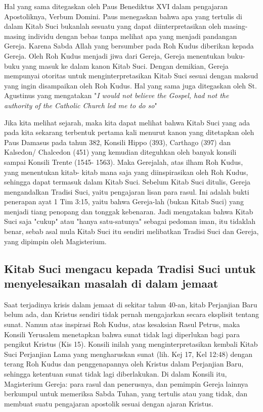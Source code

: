 Hal yang sama ditegaskan oleh Paus Benediktus XVI dalam pengajaran Apostoliknya, Verbum Domini. Paus menegaskan bahwa apa yang tertulis di dalam Kitab Suci bukanlah sesuatu yang dapat diinterpretasikan oleh masing-masing individu dengan bebas tanpa melihat apa yang menjadi pandangan Gereja. Karena Sabda Allah yang bersumber pada Roh Kudus diberikan kepada Gereja. Oleh Roh Kudus menjadi jiwa dari Gereja, Gereja menentukan buku-buku yang masuk ke dalam kanon Kitab Suci. Dengan demikian, Gereja mempunyai otoritas untuk menginterpretasikan Kitab Suci sesuai dengan maksud yang ingin disampaikan oleh Roh Kudus. Hal yang sama juga ditegaskan oleh St. Agustinus yang mengatakan "\textit{I would not believe the Gospel, had not the authority of the Catholic Church led me to do so}"

Jika kita melihat sejarah, maka kita dapat melihat bahwa Kitab Suci yang ada pada kita sekarang terbentuk pertama kali menurut kanon yang ditetapkan oleh Paus Damasus pada tahun 382, Konsili Hippo (393), Carthago (397) dan Kalsedon/ Chalcedon (451) yang kemudian diteguhkan oleh banyak konsili sampai Konsili Trente (1545- 1563). Maka Gerejalah, atas ilham Roh Kudus, yang menentukan kitab- kitab mana saja yang diinspirasikan oleh Roh Kudus, sehingga dapat termasuk dalam Kitab Suci. Sebelum Kitab Suci ditulis, Gereja mengandalkan Tradisi Suci, yaitu pengajaran lisan para rasul. Ini adalah bukti penerapan ayat 1 Tim 3:15, yaitu bahwa Gereja-lah (bukan Kitab Suci) yang menjadi tiang penopang dan tonggak kebenaran. Jadi mengatakan bahwa Kitab Suci saja "cukup" atau "hanya satu-satunya" sebagai pedoman iman, itu tidaklah benar, sebab asal mula Kitab Suci itu sendiri melibatkan Tradisi Suci dan Gereja, yang dipimpin oleh Magisterium.

\subsection{Kitab Suci mengacu kepada Tradisi Suci untuk menyelesaikan masalah di dalam jemaat}
Saat terjadinya krisis dalam jemaat di sekitar tahun 40-an, kitab Perjanjian Baru belum ada, dan Kristus sendiri tidak pernah mengajarkan secara eksplisit tentang sunat. Namun atas inspirasi Roh Kudus, atas kesaksian Rasul Petrus, maka Konsili Yerusalem menetapkan bahwa sunat tidak lagi diperlukan bagi para pengikut Kristus (Kis 15). Konsili inilah yang menginterpretasikan kembali Kitab Suci Perjanjian Lama yang mengharuskan sunat (lih. Kej 17, Kel 12:48) dengan terang Roh Kudus dan penggenapannya oleh Kristus dalam Perjanjian Baru, sehingga ketentuan sunat tidak lagi diberlakukan. Di dalam Konsili itu, Magisterium Gereja: para rasul dan penerusnya, dan pemimpin Gereja lainnya berkumpul untuk memeriksa Sabda Tuhan, yang tertulis atau yang tidak, dan membuat suatu pengajaran apostolik sesuai dengan ajaran Kristus.


